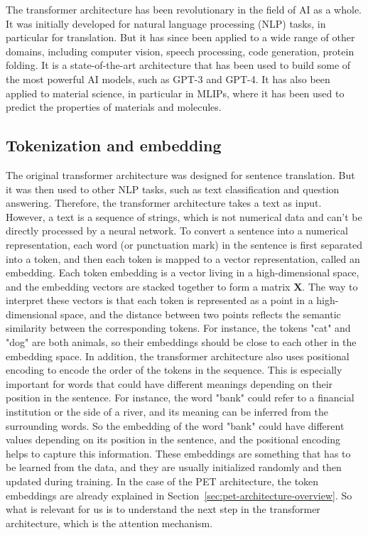 \documentclass[12pt,a4paper]{article}
\numberwithin{equation}{section}
\begin{document}
The transformer architecture has been revolutionary in the field of AI as a whole.
It was initially developed for natural language processing (NLP) tasks, in particular for translation.
But it has since been applied to a wide range of other domains,
including computer vision, speech processing, code generation, protein folding.
It is a state-of-the-art architecture that has been used to build some of the most powerful AI models, such as GPT-3 and GPT-4.
It has also been applied to material science, in particular in MLIPs, where it has been used to predict the properties of materials and molecules.

\subsection{Tokenization and embedding}

The original transformer architecture \cite{vaswani2017} was designed for sentence translation.
But it was then used to other NLP tasks, such as text classification and question answering.
Therefore, the transformer architecture takes a text as input.
However, a text is a sequence of strings, which is not numerical data and can't be directly processed by a neural network.
To convert a sentence into a numerical representation, each word (or punctuation mark) in the sentence is first separated into a token,
and then each token is mapped to a vector representation, called an embedding.
Each token embedding is a vector living in a high-dimensional space, and the embedding vectors are stacked together to form a matrix $\bm X$.
The way to interpret these vectors is that each token is represented as a point in a high-dimensional space, and the distance between two points reflects the semantic similarity between the corresponding tokens.
For instance, the tokens "cat" and "dog" are both animals, so their embeddings should be close to each other in the embedding space.
In addition, the transformer architecture also uses positional encoding to encode the order of the tokens in the sequence.
This is especially important for words that could have different meanings depending on their position in the sentence.
For instance, the word "bank" could refer to a financial institution or the side of a river, and its meaning can be inferred from the surrounding words.
So the embedding of the word "bank" could have different values depending on its position in the sentence, and the positional encoding helps to capture this information.
These embeddings are something that has to be learned from the data, and they are usually initialized randomly and then updated during training.
In the case of the PET architecture, the token embeddings are already explained in Section~\ref{sec:pet-architecture-overview}.
So what is relevant for us is to understand the next step in the transformer architecture, which is the attention mechanism.
\end{document}
